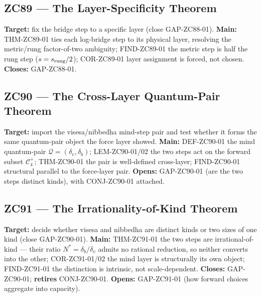 \documentclass[11pt, a4paper]{article}
\begin{document}
\subsection{ZC89 --- The Layer-Specificity Theorem}
\begin{zcbox}[title={ZC89: THM-ZC89-01 --- Layer-Specificity}]
\sloppy
\textbf{Target:} fix the bridge step to a specific layer (close
GAP-ZC88-01).
\textbf{Main:} THM-ZC89-01 ties each log-bridge step to its physical layer,
resolving the metric/rung factor-of-two ambiguity; FIND-ZC89-01 the metric
step is half the rung step ($s = s_{\rm rung}/2$); COR-ZC89-01 layer
assignment is forced, not chosen.
\textbf{Closes:} GAP-ZC88-01.
\end{zcbox}

\subsection{ZC90 --- The Cross-Layer Quantum-Pair Theorem}
\begin{zcbox}[title={ZC90: THM-ZC90-01 --- Cross-Layer Quantum-Pair}]
\sloppy
\textbf{Target:} import the visesa/nibbedha mind-step pair and test whether
it forms the same quantum-pair object the force layer showed.
\textbf{Main:} DEF-ZC90-01 the mind quantum-pair $\mathcal{Q}=(\delta_v,
\delta_b)$; LEM-ZC90-01/02 the two steps act on the forward subset
$\mathcal{C}_4^{+}$; THM-ZC90-01 the pair is well-defined cross-layer;
FIND-ZC90-01 structural parallel to the force-layer pair.
\textbf{Opens:} GAP-ZC90-01 (are the two steps distinct kinds), with
CONJ-ZC90-01 attached.
\end{zcbox}

\subsection{ZC91 --- The Irrationality-of-Kind Theorem}
\begin{zcbox}[title={ZC91: THM-ZC91-01 --- Irrationality-of-Kind}]
\sloppy
\textbf{Target:} decide whether visesa and nibbedha are distinct kinds or
two sizes of one kind (close GAP-ZC90-01).
\textbf{Main:} THM-ZC91-01 the two steps are irrational-of-kind --- their
ratio $N^{*}=\delta_b/\delta_v$ admits no rational reduction, so neither
converts into the other; COR-ZC91-01/02 the mind layer is structurally its
own object; FIND-ZC91-01 the distinction is intrinsic, not scale-dependent.
\textbf{Closes:} GAP-ZC90-01; \textbf{retires} CONJ-ZC90-01.
\textbf{Opens:} GAP-ZC91-01 (how forward choices aggregate into capacity).
\end{zcbox}
\end{document}
